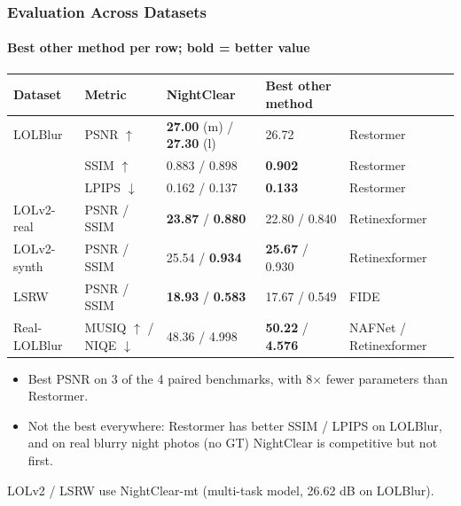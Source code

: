 ﻿\documentclass[
    11pt,%
    aspectratio=169,%
]{beamer}
\begin{document}
\begin{frame}
    \frametitle{Evaluation Across Datasets}
    \framesubtitle{Best other method per row; bold = better value}

    \begin{center}
    \footnotesize
    \setlength{\tabcolsep}{4.5pt}
    \begin{tabular}{lllll}
        \toprule
        \textbf{Dataset} & \textbf{Metric} & \textbf{NightClear} & \textbf{Best other method} & \\
        \midrule
        LOLBlur & PSNR $\uparrow$  & \textbf{27.00} (m) / \textbf{27.30} (l) & 26.72 & Restormer \\
                & SSIM $\uparrow$  & 0.883 / 0.898 & \textbf{0.902} & Restormer \\
                & LPIPS $\downarrow$ & 0.162 / 0.137 & \textbf{0.133} & Restormer \\
        LOLv2-real  & PSNR / SSIM & \textbf{23.87} / \textbf{0.880} & 22.80 / 0.840 & Retinexformer \\
        LOLv2-synth & PSNR / SSIM & 25.54 / \textbf{0.934} & \textbf{25.67} / 0.930 & Retinexformer \\
        LSRW        & PSNR / SSIM & \textbf{18.93} / \textbf{0.583} & 17.67 / 0.549 & FIDE \\
        Real-LOLBlur & MUSIQ $\uparrow$ / NIQE $\downarrow$ & 48.36 / 4.998 & \textbf{50.22} / \textbf{4.576} & NAFNet / Retinexformer \\
        \bottomrule
    \end{tabular}
    \end{center}
    \vspace{1mm}
    \footnotesize
    \begin{itemize}
        \item Best PSNR on 3 of the 4 paired benchmarks, with 8$\times$ fewer parameters than Restormer.
        \item Not the best everywhere: Restormer has better SSIM / LPIPS on LOLBlur, and on real blurry night photos (no GT) NightClear is competitive but not first.
    \end{itemize}
    {\tiny LOLv2 / LSRW use NightClear-mt (multi-task model, 26.62 dB on LOLBlur).}
\end{frame}
\end{document}
